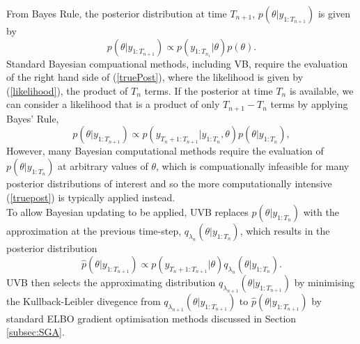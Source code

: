 \documentclass[12pt,a4paper]{article}\usepackage[]{graphicx}\usepackage[]{color}
\begin{document}
From Bayes Rule, the posterior distribution at time $T_{n+1}$, $p(\theta | y_{1:T_{n+1}})$ is given by
\begin{equation}
\label{truePost}
p(\theta | y_{1:T_{n+1}}) \propto p(y_{1:T_{n_1}} | \theta)p(\theta).
\end{equation}
Standard Bayesian compuational methods, including VB, require the evaluation of the right hand side of (\ref{truePost}), where the likelihood is given by (\ref{likelihood}), the product of $T_n$ terms. If the posterior at time $T_{n}$ is available, we can consider a likelihood that is a product of only $T_{n+1} - T_{n}$ terms by applying Bayes' Rule,
\begin{equation}
\label{updatePost}
p(\theta | y_{1:T_{n+1}}) \propto p(y_{T_{n}+1:T_{n+1}} | y_{1:T_{n}}, \theta)p(\theta | y_{1:T_{n}}),
\end{equation}
However, many Bayesian computational methods require the evaluation of $p(\theta | y_{1:T_{n}})$ at arbitrary values of $\theta$, which is compuationally infeasible for many posterior distributions of interest and so the more computationally intensive (\ref{truepost}) is typically applied instead.
\\

To allow Bayesian updating to be applied, UVB replaces $p(\theta | y_{1:T_{n}})$ with the approximation at the previous time-step, $q_{\lambda_{n}}(\theta | y_{1:T_{n}})$, which results in the posterior distribution
\begin{equation}
\label{pHatPosterior}
\hat{p}(\theta |  y_{1:T_{n+1}}) \propto p(y_{T_{n}+1:T_{n+1}} | \theta)q_{\lambda_{n}}(\theta | y_{1:T_{n}}).
\end{equation}
UVB then selects the approximating distribution $q_{\lambda_{n+1}}(\theta | y_{1:T_{n+1}})$ by minimising the Kullback-Leibler divegence from $q_{\lambda_{n+1}}(\theta | y_{1:T_{n+1}})$ to $\hat{p}(\theta |  y_{1:T_{n+1}})$ by standard ELBO gradient optimisation methods discussed in Section \ref{subsec:SGA}.
\\
\end{document}
